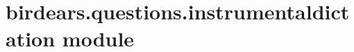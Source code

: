 \documentclass[letterpaper,10pt,english]{sphinxmanual}
\begin{document}
\begin{fulllineitems}

\begin{fulllineitems}
\label{\detokenize{index:birdears.questions.harmonicinterval.HarmonicIntervalQuestion.play_resolution}}
\end{fulllineitems}


\end{fulllineitems}



\section{birdears.questions.instrumentaldictation module}
\label{\detokenize{index:module-birdears.questions.instrumentaldictation}}\label{\detokenize{index:birdears-questions-instrumentaldictation-module}}
\end{document}
